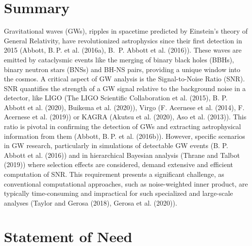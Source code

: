\documentclass[10pt,a4paper,onecolumn]{article}
\begin{document}
\section{Summary}\label{summary}

Gravitational waves (GWs), ripples in spacetime predicted by Einstein's
theory of General Relativity, have revolutionized astrophysics since
their first detection in 2015 (Abbott, B. P. et al. (2016a), B.  P.
Abbott et al. (2016)). These waves are emitted by cataclysmic events
like the merging of binary black holes (BBHs), binary neutron stars
(BNSs) and BH-NS pairs, providing a unique window into the cosmos. A
critical aspect of GW analysis is the Signal-to-Noise Ratio (SNR). SNR
quantifies the strength of a GW signal relative to the background noise
in a detector, like LIGO (The LIGO Scientific Collaboration et al.
(2015), B. P. Abbott et al. (2020), Buikema et al. (2020)), Virgo (F.
Acernese et al. (2014), F. Acernese et al. (2019)) or KAGRA (Akutsu et
al. (2020), Aso et al. (2013)). This ratio is pivotal in confirming the
detection of GWs and extracting astrophysical information from them
(Abbott, B. P. et al. (2016b)). However, specific scenarios in GW
research, particularly in simulations of detectable GW events (B. P.
Abbott et al. (2016)) and in hierarchical Bayesian analysis (Thrane and
Talbot (2019)) where selection effects are considered, demand extensive
and efficient computation of SNR. This requirement presents a
significant challenge, as conventional computational approaches, such as
noise-weighted inner product, are typically time-consuming and
impractical for such specialized and large-scale analyses (Taylor and
Gerosa (2018), Gerosa et al. (2020)).

\section{Statement of Need}\label{statement-of-need}
\end{document}
